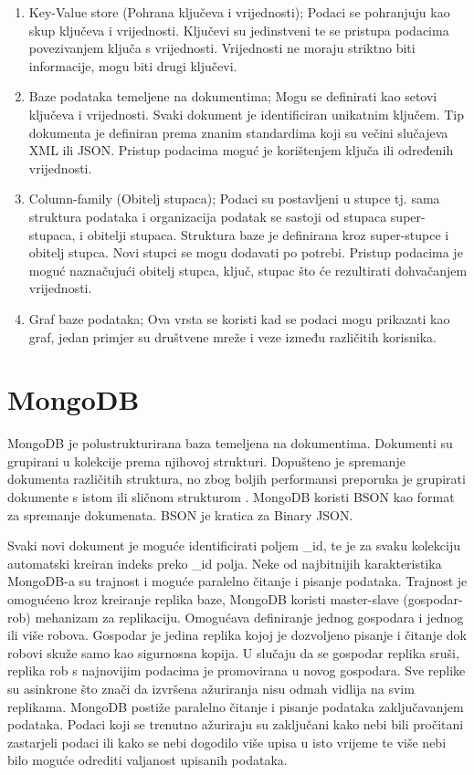 \documentclass[]{foi}
\begin{document}
\begin{enumerate}
	\item Key-Value store (Pohrana ključeva i vrijednosti); Podaci se pohranjuju kao skup ključeva i vrijednosti.
	      Ključevi su jedinstveni te se pristupa podacima povezivanjem ključa s vrijednosti.
	      Vrijednosti ne moraju striktno biti informacije, mogu biti drugi ključevi.
	\item Baze podataka temeljene na dokumentima; Mogu se definirati kao setovi ključeva i vrijednosti.
	      Svaki dokument je identificiran unikatnim ključem. Tip dokumenta je definiran prema znanim standardima
	      koji su večini slučajeva XML ili JSON. Pristup podacima moguć je korištenjem ključa ili određenih vrijednosti.
	\item Column-family (Obitelj stupaca); Podaci su postavljeni u stupce tj. sama struktura podataka i organizacija podatak
	      se sastoji od stupaca super-stupaca, i obitelji stupaca. Struktura baze je definirana kroz super-stupce i obitelj stupca.
	      Novi stupci se mogu dodavati po potrebi. Pristup podacima je moguć naznačujući obitelj stupca, ključ, stupac što će
	      rezultirati dohvačanjem vrijednosti.
	\item Graf baze podataka; Ova vrsta se koristi kad se podaci mogu prikazati kao graf, jedan primjer su društvene mreže
	      i veze između različitih korisnika.
\end{enumerate}

\section{MongoDB}

MongoDB je polustrukturirana baza temeljena na dokumentima. Dokumenti su grupirani u kolekcije prema njihovoj strukturi.
Dopušteno je spremanje dokumenta različitih struktura, no zbog boljih performansi preporuka je grupirati dokumente s
istom ili sličnom strukturom \cite{abramova2013nosql}. MongoDB koristi BSON kao format za spremanje dokumenata. BSON je kratica za Binary JSON.

Svaki novi dokument je moguće identificirati poljem \_id, te je za svaku kolekciju automatski kreiran indeks preko \_id polja.
Neke od najbitnijih karakteristika MongoDB-a su trajnost i moguće paralelno čitanje i pisanje podataka.
Trajnost je omogućeno kroz kreiranje replika baze, MongoDB koristi master-slave (gospodar-rob) mehanizam za replikaciju.
Omogućava definiranje jednog gospodara i jednog ili više robova. Gospodar je jedina replika kojoj je dozvoljeno pisanje i čitanje
dok robovi skuže samo kao sigurnosna kopija. U slučaju da se gospodar replika sruši, replika rob s najnovijim podacima je promovirana
u novog gospodara. Sve replike su asinkrone što znači da izvršena ažuriranja nisu odmah vidlija na svim replikama.
MongoDB postiže paralelno čitanje i pisanje podataka zaključavanjem podataka. Podaci koji se trenutno ažuriraju su zaključani
kako nebi bili pročitani zastarjeli podaci ili kako se nebi dogodilo više upisa u isto vrijeme te više nebi bilo moguće
odrediti valjanost upisanih podataka.
\end{document}
